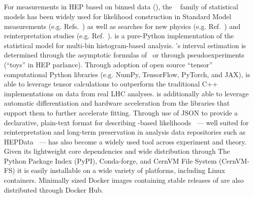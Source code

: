 \subsection{\pyhf{}}\label{subsec:pyhf}

For measurements in HEP based on binned data (), the \HiFa{}~\cite{Cranmer:1456844} family of statistical models has been widely used for likelihood construction in Standard Model measurements (e.g. Refs.~\cite{HIGG-2013-02,Aaij:2015sqa}) as well as searches for new physics (e.g. Ref.~\cite{SUSY-2016-10}) and reinterpretation studies (e.g. Ref.~\cite{Alguero:2020grj}).
\pyhf{} is a pure-Python implementation of the \HiFa{} statistical model for multi-bin histogram-based analysis.
\pyhf{}'s interval estimation is determined through the asymptotic formulas of~\cite{Cowan:2010js} or through pseudoexperiments (``toys'' in HEP parlance).
Through adoption of open source ``tensor'' computational Python libraries (e.g. NumPy, TensorFlow, PyTorch, and JAX), \pyhf{} is able to leverage tensor calculations to outperform the traditional C++ implementations on data from real LHC analyses.
\pyhf{} is additionally able to leverage automatic differentiation and hardware acceleration from the libraries that support them to further accelerate fitting.
Through use of JSON to provide a declarative, plain-text format for describing \HiFa{}-based likelihoods~\cite{ATL-PHYS-PUB-2019-029} --- well suited for reinterpretation and long-term preservation in analysis data repositories such as HEPData~\cite{Maguire:2017ypu} --- \pyhf{} has also become a widely used tool across experiment and theory.
Given its lightweight core dependencies and wide distribution through The Python Package Index (PyPI), Conda-forge, and CernVM File System (CernVM-FS) it is easily installable on a wide variety of platforms, including Linux containers.
Minimally sized Docker images containing stable releases of \pyhf{} are also distributed through Docker Hub.

